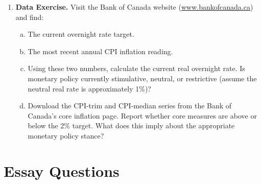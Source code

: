 \begin{enumerate}
\item \textbf{Data Exercise.} Visit the Bank of Canada website
(\url{www.bankofcanada.ca}) and find:
\begin{enumerate}[(a)]
  \item The current overnight rate target.
  \item The most recent annual CPI inflation reading.
  \item Using these two numbers, calculate the current real overnight rate.
        Is monetary policy currently stimulative, neutral, or restrictive
        (assume the neutral real rate is approximately 1\%)?
  \item Download the CPI-trim and CPI-median series from the Bank of Canada's
        core inflation page. Report whether core measures are above or below
        the 2\% target. What does this imply about the appropriate monetary
        policy stance?
\end{enumerate}

\end{enumerate}

\section*{Essay Questions}

